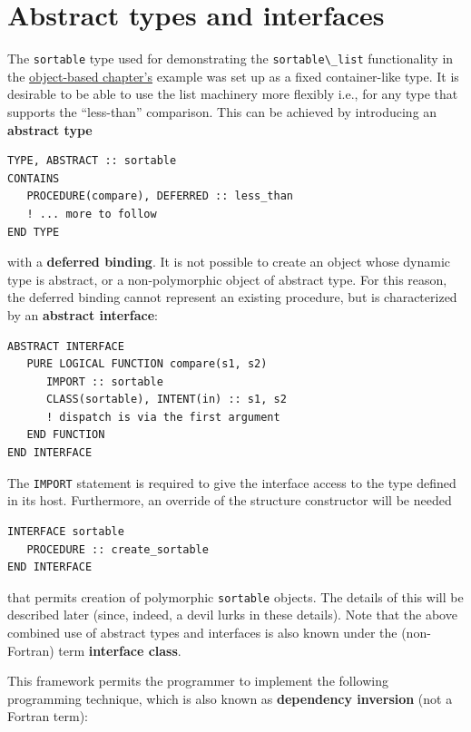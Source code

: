 \documentclass[
  paper=a4,
  ,captions=tableheading
]{scrartcl}
\newcommand{\passthrough}[1]{#1}
\begin{document}
\section{Abstract types and
interfaces}\label{abstract-types-and-interfaces}

The \passthrough{\lstinline!sortable!} type used for demonstrating the
\passthrough{\lstinline!sortable\_list!} functionality in the
\hyperref[sec:oop_techniques]{object-based chapter's} example was set up
as a fixed container-like type. It is desirable to be able to use the
list machinery more flexibly i.e., for any type that supports the
``less-than'' comparison. This can be achieved by introducing an
\textbf{abstract type}

\begin{lstlisting}
TYPE, ABSTRACT :: sortable
CONTAINS
   PROCEDURE(compare), DEFERRED :: less_than
   ! ... more to follow
END TYPE
\end{lstlisting}

with a \textbf{deferred binding}. It is not possible to create an object
whose dynamic type is abstract, or a non-polymorphic object of abstract
type. For this reason, the deferred binding cannot represent an existing
procedure, but is characterized by an \textbf{abstract interface}:

\begin{lstlisting}
ABSTRACT INTERFACE
   PURE LOGICAL FUNCTION compare(s1, s2)
      IMPORT :: sortable
      CLASS(sortable), INTENT(in) :: s1, s2
      ! dispatch is via the first argument
   END FUNCTION
END INTERFACE
\end{lstlisting}

The \passthrough{\lstinline!IMPORT!} statement is required to give the
interface access to the type defined in its host. Furthermore, an
override of the structure constructor will be needed

\begin{lstlisting}
INTERFACE sortable
   PROCEDURE :: create_sortable
END INTERFACE
\end{lstlisting}

that permits creation of polymorphic \passthrough{\lstinline!sortable!}
objects. The details of this will be described later (since, indeed, a
devil lurks in these details). Note that the above combined use of
abstract types and interfaces is also known under the (non-Fortran) term
\textbf{interface class}.

This framework permits the programmer to implement the following
programming technique, which is also known as \textbf{dependency
inversion} (not a Fortran term):
\end{document}

